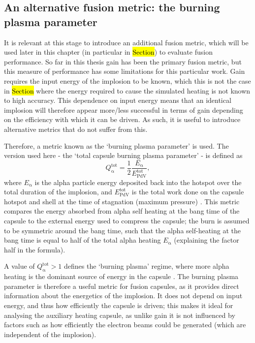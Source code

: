 \subsection{An alternative fusion metric: the burning plasma parameter}
It is relevant at this stage to introduce an additional fusion metric, which will be used later in this chapter (in particular in \hl{Section}) to evaluate fusion performance. So far in this thesis gain has been the primary fusion metric, but this measure of performance has some limitations for this particular work. Gain requires the input energy of the implosion to be known, which this is not the case in \hl{Section} where the energy required to cause the simulated heating is not known to high accuracy. This dependence on input energy means that an identical implosion will therefore appear more/less successful in terms of gain depending on the efficiency with which it can be driven. As such, it is useful to introduce alternative metrics that do not suffer from this.

Therefore, a metric known as the `burning plasma parameter' is used. The version used here - the `total capsule burning plasma parameter' - is defined as 
\begin{equation} Q^\mathrm{{tot}}_{\mathrm{\alpha}} = \frac{1}{2} \frac{E_\mathrm{\alpha}}{ E^\mathrm{{tot}}_{\mathrm{PdV}}}, \label{eqn:Qtot defn} \end{equation} where $E_\mathrm{\alpha}$ is the alpha particle energy deposited back into the hotspot over the total duration of the implosion, and $E^\mathrm{{tot}}_{\mathrm{PdV}}$ is the total work done on the capsule hotspot and shell at the time of stagnation (maximum pressure) \cite{Betti2015}. This metric compares the energy absorbed from alpha self heating at the bang time of the capsule to the external energy used to compress the capsule; the burn is assumed to be symmetric around the bang time, such that the alpha self-heating at the bang time is equal to half of the total alpha heating $E_\mathrm{\alpha}$ (explaining the factor half in the formula). 

A value of $Q^\mathrm{{tot}}_{\mathrm{\alpha}} > 1$ defines the `burning plasma' regime, where more alpha heating is the dominant source of energy in the capsule \cite{Christopherson2020}. The burning plasma parameter is therefore a useful metric for fusion capsules, as it provides direct information about the energetics of the implosion. It does not depend on input energy, and thus how efficiently the capsule is driven; this makes it ideal for analysing the auxiliary heating capsule, as unlike gain it is not influenced by factors such as how efficiently the electron beams could be generated (which are independent of the implosion).

